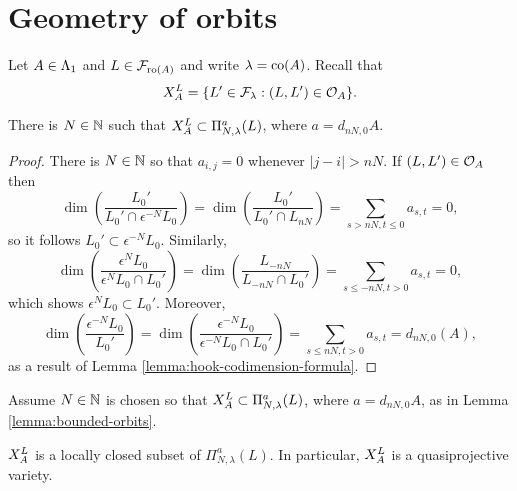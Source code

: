 \documentclass[a4paper, 11pt]{report}
\begin{document}
\section{Geometry of orbits}

Let $A\in\matrices$ and $L\in\flags_{\ro{A}}$ and write $\lambda=\co{A}$. Recall that
\begin{equation*}
\xprod[L]{A} = \{L'\in\flags_\lambda: (L,L')\in\orbit{A}\}.
\end{equation*}

\begin{lemma}\label{lemma:bounded-orbits}
There is $N\in\naturals$ such that $\xprod[L]{A}\subset\Pi_{N,\lambda}^a(L)$, where $a=d_{nN,0}{A}$.
\end{lemma}

\begin{proof}
There is $N\in\naturals$ so that $a_{i,j}=0$ whenever $|j-i|>nN$. If $(L,L')\in\orbit{A}$ then
\begin{equation*}
\dim\left(\frac{L_0'}{L_0'\cap\epsilon^{-N}L_0}\right) = \dim\left(\frac{L_0'}{L_0'\cap L_{nN}}\right) = \sum_{s>nN,t\le 0} a_{s,t} = 0,
\end{equation*}
so it follows $L_0'\subset\epsilon^{-N}L_0$. Similarly,
\begin{equation*}
\dim\left(\frac{\epsilon^N L_0}{\epsilon^N L_0\cap L_0'}\right) = \dim\left(\frac{L_{-nN}}{L_{-nN}\cap L_0'}\right) = \sum_{s\le -nN,t>0} a_{s,t} = 0,
\end{equation*}
which shows $\epsilon^N L_0\subset L_0'$. Moreover,
\begin{equation*}
\dim\left(\frac{\epsilon^{-N}L_0}{L_0'}\right) = \dim\left(\frac{\epsilon^{-N}L_0}{\epsilon^{-N}L_0\cap L_0'}\right) = \sum_{s\le nN,t>0}a_{s,t} = d_{nN,0}(A),
\end{equation*}
as a result of Lemma \ref{lemma:hook-codimension-formula}. 
\end{proof}

Assume $N\in\naturals$ is chosen so that $\xprod[L]{A}\subset\Pi_{N,\lambda}^a(L)$, where $a=d_{nN,0}{A}$, as in Lemma \ref{lemma:bounded-orbits}.

\begin{lemma}\label{lemma:orbits-are-quasiprojective}
$\xprod[L]{A}$ is a locally closed subset of $\Pi_{N,\lambda}^a(L)$. In particular, $\xprod[L]{A}$ is a quasiprojective variety.
\end{lemma}
\end{document}
